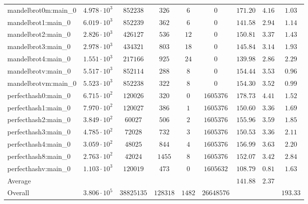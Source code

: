 \begin{tabular}{|l|c|c|c|c|c|c|c|c|}
mandelbrot0m:main\_0           & $ 4.978 \cdot 10^{3} $ & $ 852238   $ & $ 326    $ & $ 6    $ & $ 0        $ & $ 171.20      $ & $ 4.16    $ & $ 1.03    $ \\
mandelbrot1:main\_0            & $ 6.019 \cdot 10^{3} $ & $ 852239   $ & $ 362    $ & $ 6    $ & $ 0        $ & $ 141.58      $ & $ 2.94    $ & $ 1.14    $ \\
mandelbrot2:main\_0            & $ 2.826 \cdot 10^{3} $ & $ 426127   $ & $ 536    $ & $ 12   $ & $ 0        $ & $ 150.81      $ & $ 3.37    $ & $ 1.43    $ \\
mandelbrot3:main\_0            & $ 2.978 \cdot 10^{3} $ & $ 434321   $ & $ 803    $ & $ 18   $ & $ 0        $ & $ 145.84      $ & $ 3.14    $ & $ 1.93    $ \\
mandelbrot4:main\_0            & $ 1.551 \cdot 10^{3} $ & $ 217166   $ & $ 925    $ & $ 24   $ & $ 0        $ & $ 139.98      $ & $ 2.86    $ & $ 2.29    $ \\
mandelbrotv:main\_0            & $ 5.517 \cdot 10^{3} $ & $ 852114   $ & $ 288    $ & $ 8    $ & $ 0        $ & $ 154.44      $ & $ 3.53    $ & $ 0.96    $ \\
mandelbrotvm:main\_0           & $ 5.523 \cdot 10^{3} $ & $ 852238   $ & $ 322    $ & $ 8    $ & $ 0        $ & $ 154.30      $ & $ 3.52    $ & $ 0.99    $ \\
perfecthash0:main\_0           & $ 6.715 \cdot 10^{2} $ & $ 120026   $ & $ 320    $ & $ 0    $ & $ 1605376  $ & $ 178.73      $ & $ 4.41    $ & $ 1.52    $ \\
perfecthash1:main\_0           & $ 7.970 \cdot 10^{2} $ & $ 120027   $ & $ 386    $ & $ 1    $ & $ 1605376  $ & $ 150.60      $ & $ 3.36    $ & $ 1.69    $ \\
perfecthash2:main\_0           & $ 3.849 \cdot 10^{2} $ & $ 60027    $ & $ 506    $ & $ 2    $ & $ 1605376  $ & $ 155.96      $ & $ 3.59    $ & $ 1.85    $ \\
perfecthash3:main\_0           & $ 4.785 \cdot 10^{2} $ & $ 72028    $ & $ 732    $ & $ 3    $ & $ 1605376  $ & $ 150.53      $ & $ 3.36    $ & $ 2.11    $ \\
perfecthash4:main\_0           & $ 3.059 \cdot 10^{2} $ & $ 48025    $ & $ 844    $ & $ 4    $ & $ 1605376  $ & $ 156.99      $ & $ 3.63    $ & $ 2.20    $ \\
perfecthash8:main\_0           & $ 2.763 \cdot 10^{2} $ & $ 42024    $ & $ 1455   $ & $ 8    $ & $ 1605376  $ & $ 152.07      $ & $ 3.42    $ & $ 2.84    $ \\
perfecthashv:main\_0           & $ 1.103 \cdot 10^{3} $ & $ 120019   $ & $ 473    $ & $ 0    $ & $ 1605632  $ & $ 108.79      $ & $ 0.81    $ & $ 1.63    $ \\
\hline
Average                        & $                    $ & $          $ & $        $ & $      $ & $          $ & $ 141.88      $ & $ 2.37    $ & $         $ \\
\hline
Overall                        & $ 3.806 \cdot 10^{5} $ & $ 38825135 $ & $ 128318 $ & $ 1482 $ & $ 26648576 $ & $             $ & $         $ & $ 193.33  $ \\
\hline
\end{tabular}
